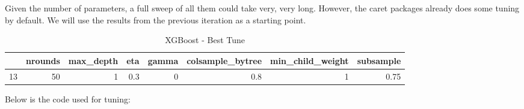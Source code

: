 \documentclass[11pt,]{article}
\begin{document}
Given the number of parameters, a full sweep of all them could take
very, very long. However, the caret packages already does some tuning by
default. We will use the results from the previous iteration as a
starting point.

\begin{table}[H]

\caption{\label{tab:xgbTree_best_tune}XGBoost - Best Tune}
\centering
\begin{tabular}[t]{lrrrrrrr}
\toprule
  & nrounds & max\_depth & eta & gamma & colsample\_bytree & min\_child\_weight & subsample\\
\midrule
\rowcolor{gray!6}  13 & 50 & 1 & 0.3 & 0 & 0.8 & 1 & 0.75\\
\bottomrule
\end{tabular}
\end{table}

Below is the code used for tuning:
\end{document}
